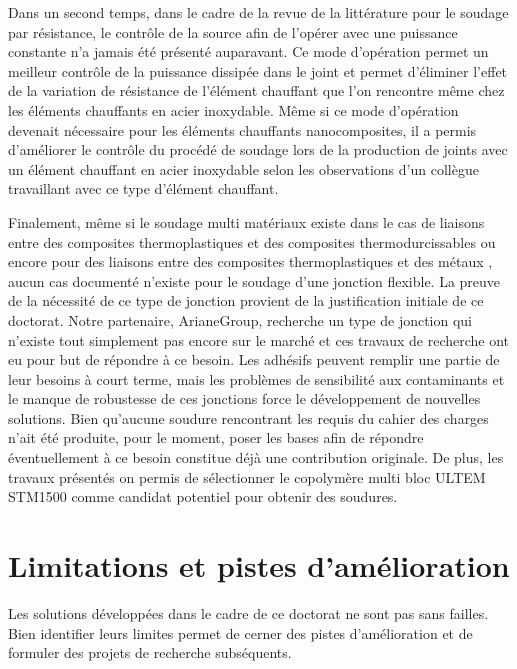 Dans un second temps, dans le cadre de la revue de la littérature pour le soudage par résistance, le contrôle de la source afin de l'opérer avec une puissance constante n'a jamais été présenté auparavant.  
Ce mode d'opération permet un meilleur contrôle de la puissance dissipée dans le joint et permet d'éliminer l'effet de la variation de résistance de l'élément chauffant que l'on rencontre même chez les éléments chauffants en acier inoxydable. 
Même si ce mode d'opération devenait nécessaire pour les éléments chauffants nanocomposites, il a permis d'améliorer le contrôle du procédé de soudage lors de la production de joints avec un élément chauffant en acier inoxydable selon les observations d'un collègue travaillant avec ce type d'élément chauffant. 

Finalement, même si le soudage multi matériaux existe dans le cas de liaisons entre des composites thermoplastiques et des composites thermodurcissables \cite{FernandezVillegas2015,Lionetto2018a} ou encore pour des liaisons entre des composites thermoplastiques et des métaux \cite{Weidmann2018,Kruger2004,Balle2009,Goushegir2016}, aucun cas documenté n'existe pour le soudage d'une jonction flexible. 
La preuve de la nécessité de ce type de jonction provient de la justification initiale de ce doctorat.
Notre partenaire, ArianeGroup, recherche un type de jonction qui n'existe tout simplement pas encore sur le marché et ces travaux de recherche ont eu pour but de répondre à ce besoin. 
Les adhésifs peuvent remplir une partie de leur besoins à court terme, mais les problèmes de sensibilité aux contaminants et le manque de robustesse de ces jonctions force le développement de nouvelles solutions. 
Bien qu'aucune soudure rencontrant les requis du cahier des charges n'ait été produite, pour le moment, poser les bases afin de répondre éventuellement à ce besoin constitue déjà une contribution originale. 
De plus, les travaux présentés on permis de sélectionner le copolymère multi bloc ULTEM STM1500 comme candidat potentiel pour obtenir des soudures. 

\section{Limitations et pistes d'amélioration}

Les solutions développées dans le cadre de ce doctorat ne sont pas sans failles. 
Bien identifier leurs limites permet de cerner des pistes d'amélioration et de formuler des projets de recherche subséquents. 

